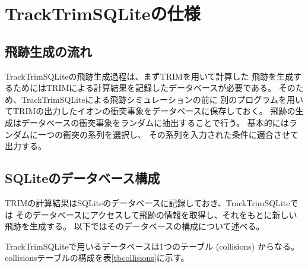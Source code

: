 \documentclass [11pt,a4paper,dvipdfmx] {jarticle}
\begin{document}
\section{TrackTrimSQLiteの仕様}

\subsection{飛跡生成の流れ}
TrackTrimSQLiteの飛跡生成過程は、まずTRIMを用いて計算した
飛跡を生成するためにはTRIMによる計算結果を記録したデータベースが必要である。
そのため、TrackTrimSQLiteによる飛跡シミュレーションの前に
別のプログラムを用いてTRIMの出力したイオンの衝突事象をデータベースに保存しておく。
飛跡の生成はデータベースの衝突事象をランダムに抽出することで行う。
基本的にはランダムに一つの衝突の系列を選択し、
その系列を入力された条件に適合させて出力する。

\subsection{SQLiteのデータベース構成}
TRIMの計算結果はSQLite\cite{sqlite}のデータベースに記録しておき、TrackTrimSQLiteでは
そのデータベースにアクセスして飛跡の情報を取得し、それをもとに新しい飛跡を生成する。
以下ではそのデータベースの構成について述べる。

TrackTrimSQLiteで用いるデータベースは1つのテーブル (collisions) からなる。
collisionsテーブルの構成を表\ref{tbcollisions}に示す。
\end{document}

